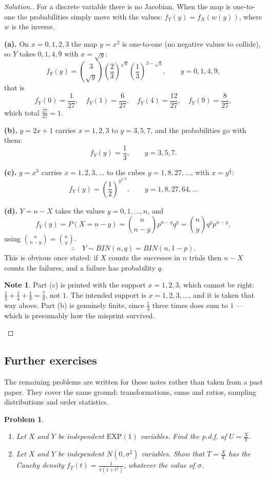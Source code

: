 \documentclass[12pt,a4paper]{report}
\theoremstyle{definition}
\newtheorem{note}[thm]{Note}
\theoremstyle{plain}
\newtheorem{problemx}{Problem}[section]
\newenvironment{problem}{\begin{problemx}}{\end{problemx}}
\newenvironment{solution}
  {\renewcommand{\qedsymbol}{}\begin{proof}[\textit{Solution}.]}
  {\end{proof}}
\begin{document}
\begin{solution}
For a discrete variable there is no Jacobian. When the map is one-to-one the
probabilities simply move with the values: $f_Y(y)=f_X\left(w(y)\right)$, where
$w$ is the inverse.

\textbf{(a).} On $x=0,1,2,3$ the map $y=x^2$ is one-to-one (no negative values to
collide), so $Y$ takes $0,1,4,9$ with $x=\sqrt y$:
\[f_Y(y)=\binom{3}{\sqrt y}\left(\frac23\right)^{\sqrt y}
\left(\frac13\right)^{3-\sqrt y},\qquad y=0,1,4,9,\]
that is
\[f_Y(0)=\frac{1}{27},\quad f_Y(1)=\frac{6}{27},\quad
f_Y(4)=\frac{12}{27},\quad f_Y(9)=\frac{8}{27},\]
which total $\frac{27}{27}=1$.

\textbf{(b).} $y=2x+1$ carries $x=1,2,3$ to $y=3,5,7$, and the probabilities go
with them:
\[f_Y(y)=\frac13,\qquad y=3,5,7.\]

\textbf{(c).} $y=x^3$ carries $x=1,2,3,\ldots$ to the cubes $y=1,8,27,\ldots$,
with $x=y^{\frac13}$:
\[f_Y(y)=\left(\frac12\right)^{y^{1/3}},\qquad y=1,8,27,64,\ldots\]

\textbf{(d).} $Y=n-X$ takes the values $y=0,1,\ldots,n$, and
\[f_Y(y)=P(X=n-y)=\binom{n}{n-y}p^{n-y}q^{y}=\binom{n}{y}q^{y}p^{n-y},\]
using $\binom{n}{n-y}=\binom{n}{y}$.
\[\therefore\quad Y\sim BIN(n,q)=BIN(n,1-p).\]
This is obvious once stated: if $X$ counts the successes in $n$ trials then
$n-X$ counts the failures, and a failure has probability $q$.

\begin{note}
Part (c) is printed with the support $x=1,2,3$, which cannot be right:
$\frac12+\frac14+\frac18=\frac78$, not $1$. The intended support is
$x=1,2,3,\ldots$, and it is taken that way above. Part (b) is genuinely finite,
since $\frac13$ three times does sum to $1$ --- which is presumably how the
misprint survived.
\end{note}
\end{solution}


\subsection{Further exercises}

The remaining problems are written for these notes rather than taken from a past
paper. They cover the same ground: transformations, sums and ratios, sampling
distributions and order statistics.

\begin{problem}
\begin{enumerate}
\item[(a).] Let $X$ and $Y$ be independent $\text{EXP}(1)$ variables. Find the
p.d.f. of $U=\frac{X}{Y}$.
\item[(b).] Let $X$ and $Y$ be independent $N\left(0,\sigma^2\right)$ variables.
Show that $T=\frac{X}{Y}$ has the Cauchy density
$f_T(t)=\frac{1}{\pi\left(1+t^2\right)}$, whatever the value of $\sigma$.
\end{enumerate}
\end{problem}
\end{document}
